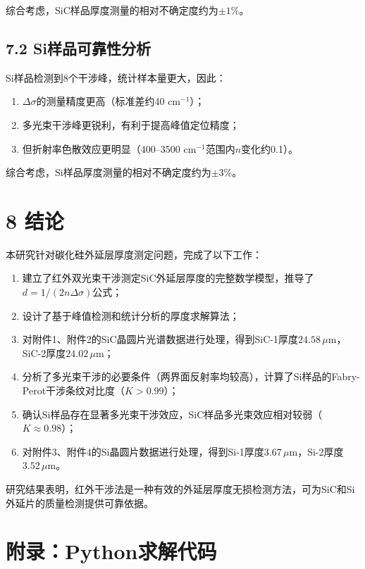 \documentclass[12pt,a4paper]{article}
\begin{document}
综合考虑，SiC样品厚度测量的相对不确定度约为$\pm1\%$。

\subsection{7.2 Si样品可靠性分析}
Si样品检测到8个干涉峰，统计样本量更大，因此：
\begin{enumerate}
\item $\Delta\sigma$的测量精度更高（标准差约40 cm$^{-1}$）；
\item 多光束干涉峰更锐利，有利于提高峰值定位精度；
\item 但折射率色散效应更明显（400--3500 cm$^{-1}$范围内$n$变化约0.1）。
\end{enumerate}

综合考虑，Si样品厚度测量的相对不确定度约为$\pm3\%$。

\section{8 结论}

本研究针对碳化硅外延层厚度测定问题，完成了以下工作：

\begin{enumerate}
\item 建立了红外双光束干涉测定SiC外延层厚度的完整数学模型，推导了$d = 1/(2n\Delta\sigma)$公式；
\item 设计了基于峰值检测和统计分析的厚度求解算法；
\item 对附件1、附件2的SiC晶圆片光谱数据进行处理，得到SiC-1厚度$24.58\,\mu\text{m}$，SiC-2厚度$24.02\,\mu\text{m}$；
\item 分析了多光束干涉的必要条件（两界面反射率均较高），计算了Si样品的Fabry-Perot干涉条纹对比度（$K > 0.99$）；
\item 确认Si样品存在显著多光束干涉效应，SiC样品多光束效应相对较弱（$K \approx 0.98$）；
\item 对附件3、附件4的Si晶圆片数据进行处理，得到Si-1厚度$3.67\,\mu\text{m}$，Si-2厚度$3.52\,\mu\text{m}$。
\end{enumerate}

研究结果表明，红外干涉法是一种有效的外延层厚度无损检测方法，可为SiC和Si外延片的质量检测提供可靠依据。

\section{附录：Python求解代码}


\end{document}
